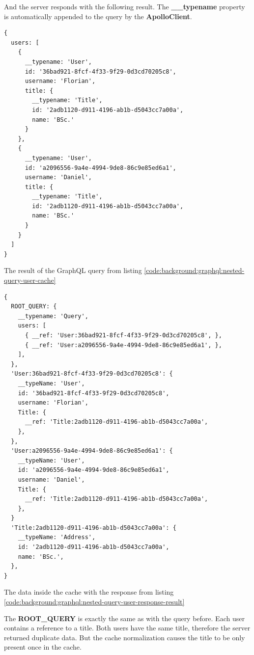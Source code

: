 And the server responds with the following result. The \textbf{\_\_typename} property is automatically appended to the query by the \textbf{ApolloClient}.

\ifshowListings
\begin{listing}[H]
\begin{verbatim}
{
  users: [
    {
      __typename: 'User',
      id: '36bad921-8fcf-4f33-9f29-0d3cd70205c8',
      username: 'Florian',
      title: {
        __typename: 'Title',
        id: '2adb1120-d911-4196-ab1b-d5043cc7a00a',
        name: 'BSc.'
      }
    }, 
    {
      __typename: 'User',
      id: 'a2096556-9a4e-4994-9de8-86c9e85ed6a1',
      username: 'Daniel',
      title: {
        __typename: 'Title',
        id: '2adb1120-d911-4196-ab1b-d5043cc7a00a',
        name: 'BSc.'
      }
    }
  ]
}
\end{verbatim}
\caption{The result of the GraphQL query from listing \ref{code:background:graphql:nested-query-user-cache}}\label{code:background:graphql:nested-query-user-response-result}
\end{listing}
\fi

\ifshowListings
\begin{listing}[H]
\begin{verbatim}
{
  ROOT_QUERY: {
    __typename: 'Query',
    users: [
      { __ref: 'User:36bad921-8fcf-4f33-9f29-0d3cd70205c8', },
      { __ref: 'User:a2096556-9a4e-4994-9de8-86c9e85ed6a1', },
    ],
  },
  'User:36bad921-8fcf-4f33-9f29-0d3cd70205c8': {
    __typeName: 'User',
    id: '36bad921-8fcf-4f33-9f29-0d3cd70205c8',
    username: 'Florian',
    Title: {
      __ref: 'Title:2adb1120-d911-4196-ab1b-d5043cc7a00a',
    },
  },
  'User:a2096556-9a4e-4994-9de8-86c9e85ed6a1': {
    __typeName: 'User',
    id: 'a2096556-9a4e-4994-9de8-86c9e85ed6a1',
    username: 'Daniel',
    Title: {
      __ref: 'Title:2adb1120-d911-4196-ab1b-d5043cc7a00a',
    },
  }
  'Title:2adb1120-d911-4196-ab1b-d5043cc7a00a': {
    __typeName: 'Address',
    id: '2adb1120-d911-4196-ab1b-d5043cc7a00a',
    name: 'BSc.',
  },
}
\end{verbatim}
\caption{The data inside the cache with the response from listing \ref{code:background:graphql:nested-query-user-response-result}}\label{code:background:graphql:nested-query-user-cache-representation}
\end{listing}
\fi

The \textbf{ROOT\_QUERY} is exactly the same as with the query before. Each user contains a reference to a title. Both users have the same title, therefore the server returned duplicate data. But the cache normalization causes the title to be only present once in the cache.

